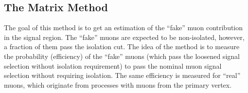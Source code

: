 % 

\subsection{The Matrix Method}
\label{subsec:matrix_method}
The goal of this method is to get an estimation of the ``fake'' muon contribution in the signal region.
The ``fake'' muons are expected to be non-isolated, however, a fraction of them pass the isolation cut. 
The idea of the method is to measure the probability (efficiency) of the ``fake'' muons
(which pass the loosened signal selection without isolation requirement) to pass the nominal muon signal selection without requiring isolation.
The same efficiency is measured for ``real'' muons, which originate from processes with muons from the primary vertex.

